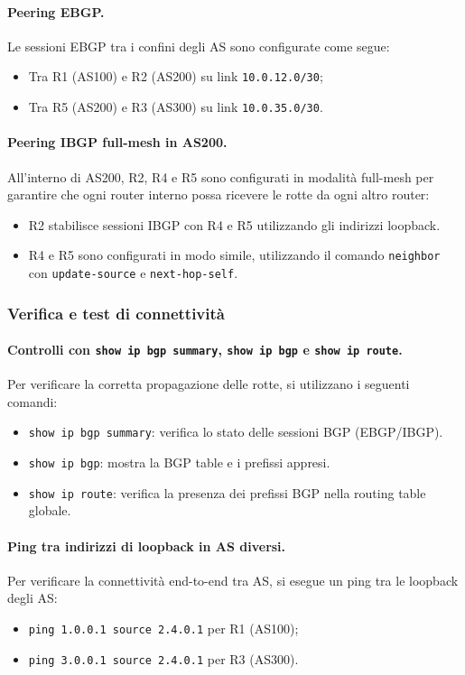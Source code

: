 \paragraph{Peering EBGP.}
Le sessioni EBGP tra i confini degli AS sono configurate come segue:
\begin{itemize}
    \item Tra R1 (AS100) e R2 (AS200) su link \texttt{10.0.12.0/30};
    \item Tra R5 (AS200) e R3 (AS300) su link \texttt{10.0.35.0/30}.
\end{itemize}

\paragraph{Peering IBGP full-mesh in AS200.}
All’interno di AS200, R2, R4 e R5 sono configurati in modalità full-mesh per garantire che ogni router interno possa ricevere le rotte da ogni altro router:
\begin{itemize}
    \item R2 stabilisce sessioni IBGP con R4 e R5 utilizzando gli indirizzi loopback.
    \item R4 e R5 sono configurati in modo simile, utilizzando il comando \texttt{neighbor} con \texttt{update-source} e \texttt{next-hop-self}.
\end{itemize}

\subsubsection{Verifica e test di connettività}

\paragraph{Controlli con \texttt{show ip bgp summary}, \texttt{show ip bgp} e \texttt{show ip route}.}
Per verificare la corretta propagazione delle rotte, si utilizzano i seguenti comandi:
\begin{itemize}
    \item \texttt{show ip bgp summary}: verifica lo stato delle sessioni BGP (EBGP/IBGP).
    \item \texttt{show ip bgp}: mostra la BGP table e i prefissi appresi.
    \item \texttt{show ip route}: verifica la presenza dei prefissi BGP nella routing table globale.
\end{itemize}

\paragraph{Ping tra indirizzi di loopback in AS diversi.}
Per verificare la connettività end-to-end tra AS, si esegue un ping tra le loopback degli AS:
\begin{itemize}
    \item \texttt{ping 1.0.0.1 source 2.4.0.1} per R1 (AS100);
    \item \texttt{ping 3.0.0.1 source 2.4.0.1} per R3 (AS300).
\end{itemize}

